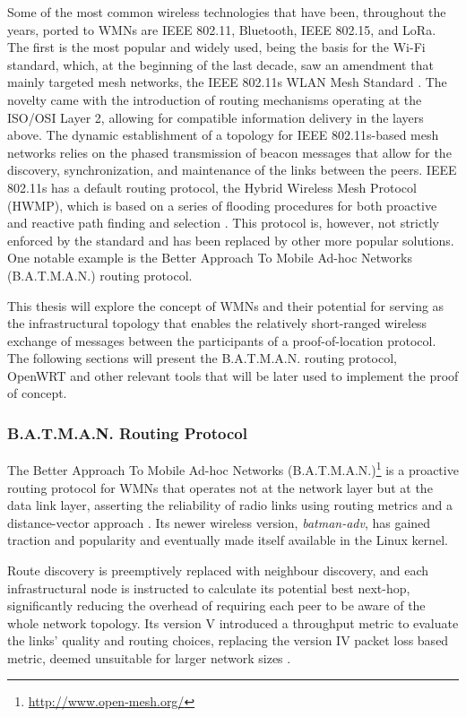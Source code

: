 Some of the most common wireless technologies that have been, throughout the years, ported to WMNs are IEEE 802.11, Bluetooth, IEEE 802.15, and LoRa. The first is the most popular and widely used, being the basis for the Wi-Fi standard, which, at the beginning of the last decade, saw an amendment that mainly targeted mesh networks, the IEEE 802.11s WLAN Mesh Standard \cite{hiertz2010ieee}. The novelty came with the introduction of routing mechanisms operating at the ISO/OSI Layer 2, allowing for compatible information delivery in the layers above. The dynamic establishment of a topology for IEEE 802.11s-based mesh networks relies on the phased transmission of beacon messages that allow for the discovery, synchronization, and maintenance of the links between the peers. IEEE 802.11s has a default routing protocol, the Hybrid Wireless Mesh Protocol (HWMP), which is based on a series of flooding procedures for both proactive and reactive path finding and selection \cite{bari2012performance}. This protocol is, however, not strictly enforced by the standard and has been replaced by other more popular solutions. One notable example is the Better Approach To Mobile Ad-hoc Networks (B.A.T.M.A.N.) routing protocol.

This thesis will explore the concept of WMNs and their potential for serving as the infrastructural topology that enables the relatively short-ranged wireless exchange of messages between the participants of a proof-of-location protocol. The following sections will present the B.A.T.M.A.N. routing protocol, OpenWRT and other relevant tools that will be later used to implement the proof of concept.

\subsubsection{B.A.T.M.A.N. Routing Protocol}

The Better Approach To Mobile Ad-hoc Networks (B.A.T.M.A.N.)\footnote{\url{http://www.open-mesh.org/}} is a proactive routing protocol for WMNs that operates not at the network layer but at the data link layer, asserting the reliability of radio links using routing metrics and a distance-vector approach \cite{seither2011routing}. Its newer wireless version, \emph{batman-adv}, has gained traction and popularity and eventually made itself available in the Linux kernel.

Route discovery is preemptively replaced with neighbour discovery, and each infrastructural node is instructed to calculate its potential best next-hop, significantly reducing the overhead of requiring each peer to be aware of the whole network topology. Its version V introduced a throughput metric to evaluate the links' quality and routing choices, replacing the version IV packet loss based metric, deemed unsuitable for larger network sizes \cite{seither2011routing}.

